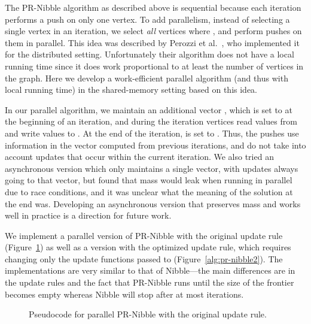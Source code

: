 The PR-Nibble algorithm as described above is sequential because each
iteration performs a push on only one vertex. To add parallelism,
instead of selecting a single vertex in an iteration, we select
\emph{all} vertices  where , and perform
pushes on them in parallel. This idea was described by Perozzi et
al.~\cite{Perozzi2014}, who implemented it for the distributed setting. Unfortunately their algorithm does not
have a local running time since it does work proportional to at least the
number of vertices in the graph. Here we develop a work-efficient parallel algorithm (and thus with local running time) in the
shared-memory setting based on this idea.

In our parallel algorithm, we
maintain an additional vector , which is set to  at
the beginning of an iteration, and during the iteration vertices read
values from  and write values to . At the end of the iteration,
 is set to . Thus, the pushes use information in the
 vector computed from previous iterations, and do not take into
account updates that occur within the current iteration. We also tried
an asynchronous version which only maintains a single  vector,
with updates always going to that vector, but found that 
mass would leak when running in parallel due to race conditions, and
it was unclear what the meaning of the solution at the end
was. Developing an asynchronous version that preserves mass and works
well in practice is a direction for future work.


We implement a parallel version of PR-Nibble with the original update
rule (Figure~\ref{alg:pr-nibble}) as well as a version with
the optimized update rule, which requires changing only the update
functions passed to \emap{} (Figure~\ref{alg:pr-nibble2}).  The
implementations are very similar to that of Nibble---the main differences
are in the update rules 
and the fact that PR-Nibble runs until the size of the frontier
becomes empty whereas Nibble will stop after at most  iterations.


\begin{figure}[!t]
\vspace{-6pt}
\scriptsize
\begin{algorithmic}[1] 
\State 
\State 
\State 
{} 
\State 
\EndProcedure
\smallskip
{} 
\State 
\State 
\EndProcedure

\smallskip
{}
\State 
\State  {}
\While {}
\State 
\State 
\State 
\State  {}
\EndWhile
\State \algorithmicreturn{} 
\EndProcedure
\end{algorithmic}
\caption{Pseudocode for parallel PR-Nibble with the original update rule.} \label{alg:pr-nibble}
\end{figure}

